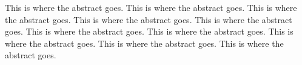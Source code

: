This is where the abstract goes.  This is where the abstract
goes. This is where the abstract goes.  This is where the 
abstract goes.  This is where the abstract goes.  This is where 
the abstract goes.  This is where the abstract goes.  This is 
where the abstract goes.  This is where the abstract goes.  This 
is where the abstract goes.
